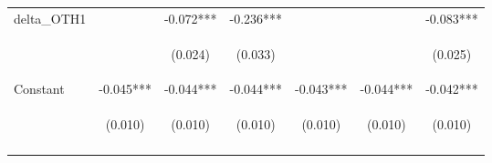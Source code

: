 \begin{center}
\begin{tabular}{lcccccc}
delta\_OTH1 &  & -0.072*** & -0.236*** &  &  & -0.083*** \\
\vspace{4pt} & \begin{footnotesize}\end{footnotesize} & \begin{footnotesize}(0.024)\end{footnotesize} & \begin{footnotesize}(0.033)\end{footnotesize} & \begin{footnotesize}\end{footnotesize} & \begin{footnotesize}\end{footnotesize} & \begin{footnotesize}(0.025)\end{footnotesize} \\
Constant & -0.045*** & -0.044*** & -0.044*** & -0.043*** & -0.044*** & -0.042*** \\
 & \begin{footnotesize}(0.010)\end{footnotesize} & \begin{footnotesize}(0.010)\end{footnotesize} & \begin{footnotesize}(0.010)\end{footnotesize} & \begin{footnotesize}(0.010)\end{footnotesize} & \begin{footnotesize}(0.010)\end{footnotesize} & \begin{footnotesize}(0.010)\end{footnotesize} \\
\vspace{4pt} & \begin{footnotesize}\end{footnotesize} & \begin{footnotesize}\end{footnotesize} & \begin{footnotesize}\end{footnotesize} & \begin{footnotesize}\end{footnotesize} & \begin{footnotesize}\end{footnotesize} & \begin{footnotesize}\end{footnotesize} \\

\end{tabular}
\end{center}
